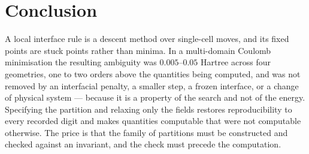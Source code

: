 \documentclass[11pt]{article}
\begin{document}
\section{Conclusion}

A local interface rule is a descent method over single-cell moves, and its fixed points are stuck
points rather than minima. In a multi-domain Coulomb minimisation the resulting ambiguity was
$0.005$--$0.05$ Hartree across four geometries, one to two orders above the quantities being
computed, and was not removed by an interfacial penalty, a smaller step, a frozen interface, or a
change of physical system --- because it is a property of the search and not of the energy.
Specifying the partition and relaxing only the fields restores reproducibility to every recorded
digit and makes quantities computable that were not computable otherwise. The price is that the
family of partitions must be constructed and checked against an invariant, and the check must
precede the computation.
\end{document}
